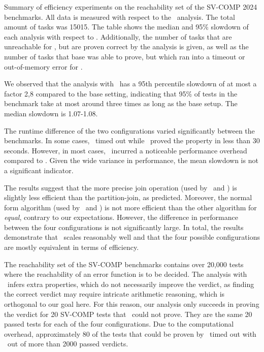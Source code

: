 \begin{table}[t]
    \centering
    \caption{Summary of efficiency experiments on the reachability set
        of the SV-COMP 2024 benchmarks.
        All data is measured with respect to the \base\ analysis.
        The total amount of tasks was 15015.
        The table shows the median and 95\% slowdown of each analysis with respect to \base.
        Additionally, the number of tasks that are unreachable for \base, but are proven correct by the analysis is given, as well as the number of tasks that base was able to prove, but which ran into a timeout or out-of-memory error for \cpo.
        }\label{tab:summary-svcomp}
    
\end{table}

We observed that the analysis with \cpo\ has a 95th percentile slowdown of at most a factor 2,8 compared to the base setting,
indicating that 95\% of tests in the benchmark take at most around three times as long as the base setup.
The median slowdown is 1.07-1.08.

The runtime difference of the two configurations varied significantly between the benchmarks.
In some cases, \base\ timed out while \cpo\ proved the property in less than 30 seconds.
However, in most cases, \cpo\ incurred a noticeable performance overhead compared to \base.
Given the wide variance in performance, the mean slowdown is not a significant indicator.

The results suggest that the more precise join operation (used by \cpou\ and \cpot) is slightly less efficient than the partition-join, as predicted.
Moreover, the normal form algorithm (used by \cpou\ and \cpod) is not more efficient than the other algorithm for \emph{equal}, contrary to our expectations.
However, the difference in performance between the four configurations is not significantly large.
In total, the results demonstrate that \cpo\ scales reasonably well and that the four possible configurations are mostly equivalent in terms of efficiency.

The reachability set of the SV-COMP benchmarks contains over 20,000 tests where the reachability of an error function is to be decided.
The analysis with \cpo\ infers extra properties, which do not necessarily improve the verdict,
as finding the correct verdict may require intricate arithmetic reasoning, which is orthogonal to our goal here.
For this reason, our analysis only succeeds in proving the verdict for 20 SV-COMP tests that \base\ could not prove.
They are the same 20 passed tests for each of the four configurations.
Due to the computational overhead, approximately 80 of the tests that could be proven by \base\ timed out with \cpo\
out of more than 2000 passed verdicts.

